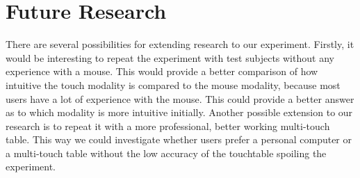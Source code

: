 \documentclass[a4paper,10pt]{report}
\begin{document}
\section{Future Research}
There are several possibilities for extending research to our experiment.
Firstly, it would be interesting to repeat the experiment with test subjects without any experience with a mouse.
This would provide a better comparison of how intuitive the touch modality is compared to the mouse modality, because most users have a lot of experience with the mouse. This could provide a better answer as to which modality is more intuitive initially. Another possible extension to our research is to repeat it with a more professional, better working multi-touch table. This way we could investigate whether users prefer a personal computer or a multi-touch table without the low accuracy of the touchtable spoiling the experiment. 



\end{document}
